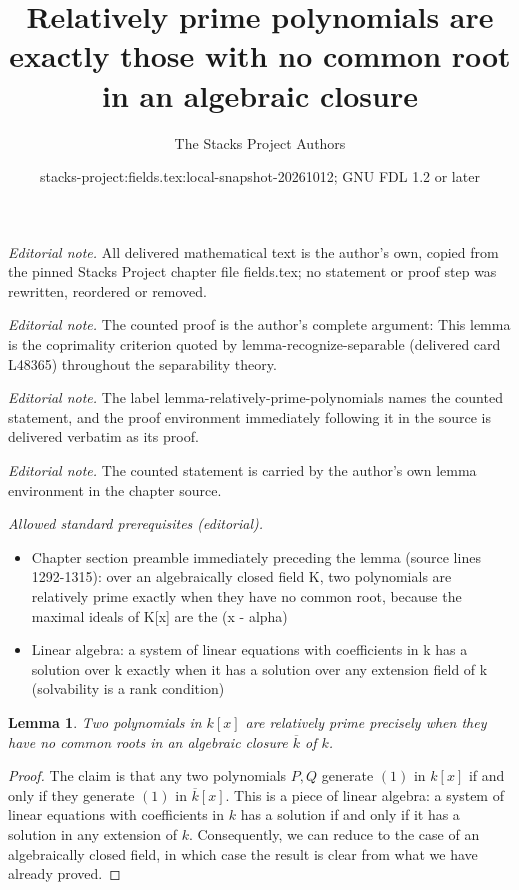 \documentclass[10pt,a4paper]{amsart}
\title{Relatively prime polynomials are exactly those with no common root in an algebraic closure}
\author{The Stacks Project Authors}
\date{stacks-project:fields.tex:local-snapshot-20261012; GNU FDL 1.2 or later}
\theoremstyle{plain}
\newtheorem{lemma}[subsection]{Lemma}
\theoremstyle{definition}
\theoremstyle{remark}
\numberwithin{equation}{subsection}
\begin{document}
\maketitle
\noindent\textit{Editorial note.} All delivered mathematical text is the author's own, copied from the pinned Stacks Project chapter file fields.tex; no statement or proof step was rewritten, reordered or removed.\par\medskip
\noindent\textit{Editorial note.} The counted proof is the author's complete argument: This lemma is the coprimality criterion quoted by lemma-recognize-separable (delivered card L48365) throughout the separability theory.\par\medskip
\noindent\textit{Editorial note.} The label lemma-relatively-prime-polynomials names the counted statement, and the proof environment immediately following it in the source is delivered verbatim as its proof.\par\medskip
\noindent\textit{Editorial note.} The counted statement is carried by the author's own lemma environment in the chapter source.\par\medskip
\noindent\textit{Allowed standard prerequisites (editorial).}\begin{itemize}
\item Chapter section preamble immediately preceding the lemma (source lines 1292-1315): over an algebraically closed field K, two polynomials are relatively prime exactly when they have no common root, because the maximal ideals of K[x] are the (x - alpha)
\item Linear algebra: a system of linear equations with coefficients in k has a solution over k exactly when it has a solution over any extension field of k (solvability is a rank condition)
\end{itemize}\medskip
\begin{lemma}
\label{lemma-relatively-prime-polynomials}
Two polynomials in $k[x]$ are relatively prime precisely when they
have no common roots in an algebraic closure $\overline{k}$ of $k$.
\end{lemma}

\begin{proof}
The claim is that any two polynomials $P, Q$ generate $(1)$ in $k[x]$ if and
only if they generate $(1)$ in $\overline{k}[x]$. This is a piece of
linear algebra: a system of linear equations with coefficients in $k$ has
a solution if and only if it has a solution in any extension of $k$.
Consequently, we can reduce to the case of an algebraically closed field, in
which case the result is clear from what we have already proved.
\end{proof}
\end{document}
